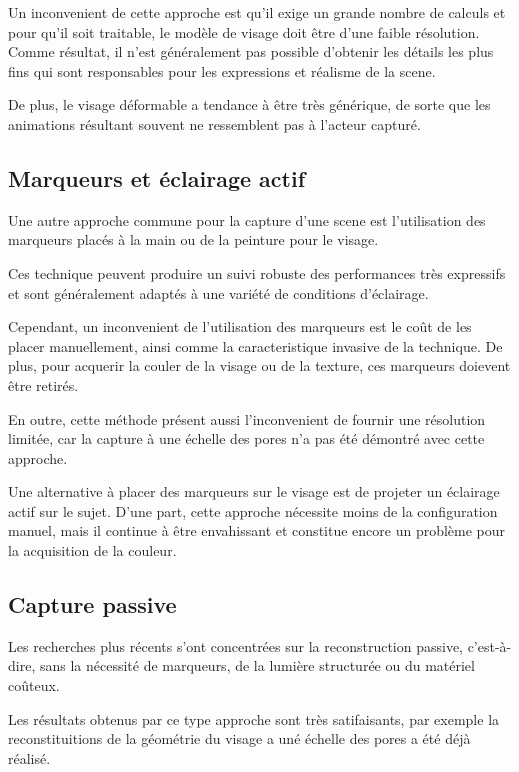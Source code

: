\documentclass[a4paper,10pt]{article}
\begin{document}
Un inconvenient de cette approche est qu'il exige un grande nombre de calculs et pour qu'il soit traitable, le modèle de visage doit être d'une faible résolution.
Comme résultat, il n'est généralement pas possible d'obtenir les détails les plus fins qui sont responsables pour les expressions et réalisme de la scene.

De plus, le visage déformable a tendance à être très générique, de sorte que les animations résultant souvent ne ressemblent pas à l'acteur capturé.

\subsection{Marqueurs et éclairage actif}

Une autre approche commune pour la capture d'une scene est l'utilisation des marqueurs placés à la main ou de la peinture pour le visage.

Ces technique peuvent produire un suivi robuste des performances très expressifs et sont généralement adaptés à une variété de conditions d'éclairage.

Cependant, un inconvenient de l'utilisation des marqueurs est le coût de les placer manuellement, ainsi comme la caracteristique invasive de la technique. De plus, pour acquerir la couler de la visage ou de la texture, ces marqueurs doievent être retirés.

En outre, cette méthode présent aussi l'inconvenient de fournir une résolution limitée, car la capture à une échelle des pores n'a pas été démontré avec cette approche.

Une alternative à placer des marqueurs sur le visage est de projeter un éclairage actif sur le sujet. D'une part, cette approche nécessite moins de la configuration manuel, mais il continue à être envahissant et constitue encore un problème pour la acquisition de la couleur.

\subsection{Capture passive }

Les recherches plus récents s'ont concentrées sur la reconstruction passive, c'est-à-dire, sans la nécessité de marqueurs, de la lumière structurée ou du matériel coûteux.

Les résultats obtenus par ce type approche sont très satifaisants, par exemple la reconstituitions de la géométrie du visage a uné échelle des pores a été déjà réalisé.
\end{document}
